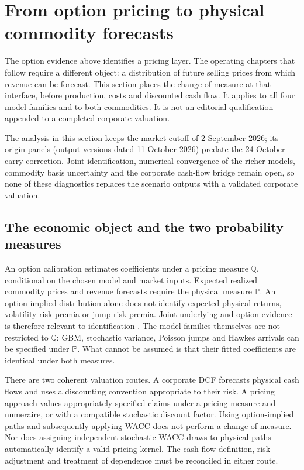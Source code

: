 \section{From option pricing to physical commodity forecasts}
\label{sec:physical-measure-bridge}

The option evidence above identifies a pricing layer. The operating chapters
that follow require a different object: a distribution of future selling
prices from which revenue can be forecast. This section places the change of
measure at that interface, before production, costs and discounted cash flow.
It applies to all four model families and to both commodities. It is not an
editorial qualification appended to a completed corporate valuation.

The analysis in this section keeps the market cutoff of 2 September 2026; its
origin panels (output versions dated 11 October 2026) predate the 24 October
carry correction. Joint identification, numerical
convergence of the richer models, commodity basis uncertainty and the
corporate cash-flow bridge remain open, so none of these diagnostics replaces
the scenario outputs with a validated corporate valuation.

\subsection{The economic object and the two probability measures}
\label{sec:pq-two-measures}

An option calibration estimates coefficients under a pricing measure
$\mathbb Q$, conditional on the chosen model and market inputs. Expected
realized commodity prices and revenue forecasts require the physical measure
$\mathbb P$. An option-implied distribution alone does not identify expected
physical returns, volatility risk premia or jump risk premia. Joint
underlying and option evidence is therefore relevant to identification
\cite{pan2002}. The model families themselves are not restricted to
$\mathbb Q$: GBM, stochastic variance, Poisson jumps and Hawkes arrivals can
be specified under $\mathbb P$. What cannot be assumed is that their fitted
coefficients are identical under both measures.

There are two coherent valuation routes. A corporate DCF forecasts physical
cash flows and uses a discounting convention appropriate to their risk. A
pricing approach values appropriately specified claims under a pricing
measure and numeraire, or with a compatible stochastic discount factor.
Using option-implied paths and subsequently applying WACC does not perform
a change of measure. Nor does assigning independent stochastic WACC draws
to physical paths automatically identify a valid pricing kernel. The
cash-flow definition, risk adjustment and treatment of dependence must be
reconciled in either route.

